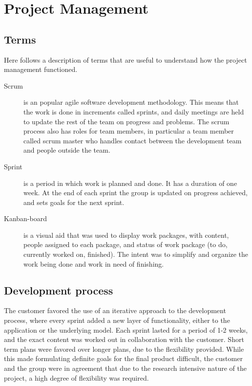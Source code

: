 \chapter{Project Management}
\section{Terms}
Here follows a description of terms that are useful to understand how the project management functioned. 

\begin{description}
\item[Scrum] \label{def:scrum}is an popular agile software development methodology. This means that the work is done in increments called sprints, and daily meetings are held to update the rest of the team on progress and problems. The scrum process also has roles for team members, in particular a team member called scrum master who handles contact between the development team and people outside the team.

\item[Sprint] \label{def:sprint} is a period in which work is planned and done. It has a duration of one week. At the end of each sprint the group is updated on progress achieved, and sets goals for the next sprint. 
\item[Kanban-board] \label{def:kanban} is a visual aid that was used to display work packages, with content, people assigned to each package, and status of work package (to do, currently worked on, finished). The intent was to simplify and organize the work being done and work in need of finishing.
\end{description}
\section{Development process}
\label{def:devProcess}

The customer favored the use of an iterative approach to the development process, where every sprint added a new layer of functionality, either to the application or the underlying model. Each sprint lasted for a period of 1-2 weeks, and the exact content was worked out in collaboration with the customer. Short term plans were favored over longer plans, due to the flexibility provided. While this made formulating definite goals for the final product difficult, the customer and the group were in agreement that due to the research intensive nature of the project, a high degree of flexibility was required. 

